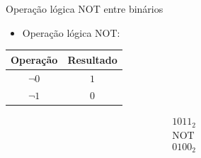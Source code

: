 

\begin{frame}{Operação lógica NOT entre binários}
    \begin{itemize}
        \item Operação lógica NOT:
    \end{itemize}

    \begin{table}[h]
        \centering
        \begin{tabular}{c|c}
            \hline
            \textbf{Operação} & \textbf{Resultado} \\
            \hline
            $\neg 0$ & $1$ \\
            $\neg 1$ & $0$ \\
            \hline
        \end{tabular}
    \end{table}

    \[
    \begin{array}{r}
          1011_{2} \\
        \text{NOT} \\
        \hline
          0100_{2}
    \end{array}
    \]

\end{frame}

